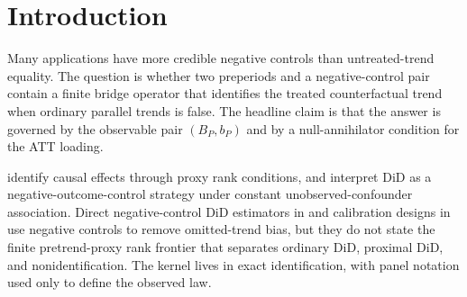 \documentclass[11pt]{article}
\renewcommand{\Pr}{\mathbb{P}}
\theoremstyle{definition}
\theoremstyle{plain}
\theoremstyle{remark}
\begin{document}
\begin{abstract}
Difference-in-differences can be read as a negative-control design, but the published proximal and negative-control literatures do not isolate the finite preperiod object that decides when proxy information replaces parallel trends.  This proposal studies a two-group, three-period, binary-proxy design and asks for the exact frontier among three regimes: ordinary parallel trends identifies the ATT, a proximal bridge identifies the ATT after parallel trends fails, and neither restriction identifies the ATT.  The focal object is the observable matrix pair \((B_P,b_P)\) and the loading \(\pi_P(w)=\Pr_P(W=w\mid G=1)\), not a generic completeness condition.  The main conjecture states that, on a finite nondegenerate class, primitive negative-control exclusion and bridge stability imply proximal DiD identifies the ATT if and only if the bridge equation is solvable and \(\pi_P\) annihilates every null bridge direction, while ordinary DiD identifies it if and only if the untreated trend bias is zero.  A worked binary law computes all three regimes and shows that the parallel-trends and proximal-bridge restrictions are neither nested nor equivalent.  If resolved, the result would turn negative-control DiD diagnostics into an identification frontier rather than a placebo-test convention.
\end{abstract}

\section{Introduction}
Many applications have more credible negative controls than untreated-trend equality.  The question is whether two preperiods and a negative-control pair contain a finite bridge operator that identifies the treated counterfactual trend when ordinary parallel trends is false.  The headline claim is that the answer is governed by the observable pair \((B_P,b_P)\) and by a null-annihilator condition for the ATT loading.

\citet[\S3.2, pp. 1157--1160]{MiaoGengTchetgen2018ProxyVariables} identify causal effects through proxy rank conditions, and \citet[\S3, pp. 12--15]{SoferRichardsonColicinoSchwartzTchetgen2016NOC} interpret DiD as a negative-outcome-control strategy under constant unobserved-confounder association.  Direct negative-control DiD estimators in \citet{Gregori2025DIDNegativeControls} and calibration designs in \citet{ZhangEtAl2025NCCDiD} use negative controls to remove omitted-trend bias, but they do not state the finite pretrend-proxy rank frontier that separates ordinary DiD, proximal DiD, and nonidentification.  The kernel lives in exact identification, with panel notation used only to define the observed law.
\end{document}
